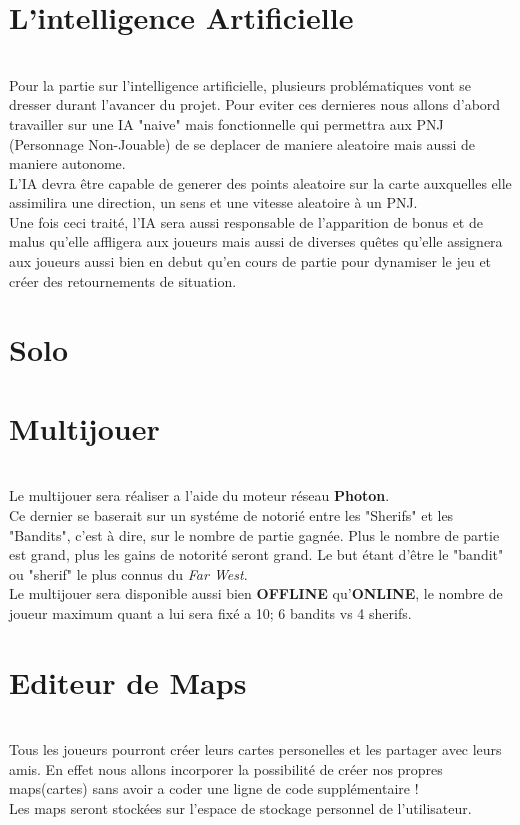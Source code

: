 \documentclass[12pt]{report}
\begin{document}
        \section{L'intelligence Artificielle}
            \\ Pour la partie sur l'intelligence artificielle, plusieurs problématiques vont se dresser durant l'avancer du projet. \newline
            Pour eviter ces dernieres nous allons d'abord travailler sur une IA "naive" mais fonctionnelle qui permettra aux PNJ (Personnage Non-Jouable) de se deplacer de maniere aleatoire mais aussi de maniere autonome.\\ L'IA devra être capable de generer des points aleatoire sur la carte auxquelles elle assimilira une direction, un sens et une vitesse aleatoire à un PNJ.\\ Une fois ceci traité, l'IA sera aussi responsable de l'apparition de bonus et de malus qu'elle affligera aux joueurs mais aussi de diverses quêtes qu'elle assignera aux joueurs aussi bien en debut qu'en cours de partie pour dynamiser le jeu et créer des retournements de situation.
        \section{Solo}
        \section{Multijouer}
            \\ Le multijouer sera réaliser a l'aide du moteur réseau \textbf{Photon}. \\
              Ce dernier se baserait sur un systéme de notorié entre les "Sherifs" 
            et les "Bandits", c'est à dire, sur le nombre de partie gagnée. Plus le nombre de partie est grand, plus les gains de notorité seront grand. Le but étant d'être le "bandit" ou "sherif" le plus connus du \textit{Far West}. 
            \\ Le multijouer sera disponible aussi bien \textbf{OFFLINE} qu'\textbf{ONLINE}, le nombre de joueur maximum quant a lui sera fixé a 10; 6 bandits vs 4 sherifs.
        \section{Editeur de Maps}
            \\ 
            Tous les joueurs pourront créer leurs cartes personelles et les partager avec leurs amis. En effet nous allons incorporer la possibilité de créer nos propres maps(cartes) sans avoir a coder une ligne de code supplémentaire !\\ Les maps seront stockées sur l'espace de stockage personnel de l'utilisateur.
\end{document}
